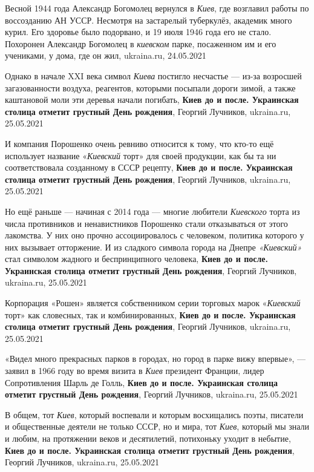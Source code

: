 Весной 1944 года Александр Богомолец вернулся в \emph{Киев}, где возглавил работы по
воссозданию АН УССР. Несмотря на застарелый туберкулёз, академик много курил.
Его здоровье было подорвано, и 19 июля 1946 года его не стало. Похоронен
Александр Богомолец в \emph{киевском} парке, посаженном им и его учениками, у дома,
где он жил, ukraina.ru, 24.05.2021

Однако в начале XXI века символ \emph{Киева} постигло несчастье — из-за
возросшей загазованности воздуха, реагентов, которыми посыпали дороги зимой, а
также каштановой моли эти деревья начали погибать, 
\textbf{Киев до и после. Украинская столица отметит грустный День рождения}, Георгий Лучников, ukraina.ru, 25.05.2021

И компания Порошенко очень ревниво относится к тому, что кто-то ещё использует
название «\emph{Киевский} торт» для своей продукции, как бы та ни
соответствовала созданному в СССР рецепту,
\textbf{Киев до и после. Украинская столица отметит грустный День рождения}, Георгий Лучников, ukraina.ru, 25.05.2021

Но ещё раньше — начиная с 2014 года — многие любители \emph{Киевского} торта из
числа противников и ненавистников Порошенко стали отказываться от этого
лакомства. У них оно прочно ассоциировалось с человеком, политика которого у
них вызывает отторжение. И из сладкого символа города на Днепре
\emph{«Киевский»} стал символом жадного и беспринципного человека, 
\textbf{Киев до и после. Украинская столица отметит грустный День рождения}, Георгий Лучников, ukraina.ru, 25.05.2021

Корпорация «Рошен» является собственником серии торговых марок «\emph{Киевский}
торт» как словесных, так и комбинированных, 
\textbf{Киев до и после. Украинская столица отметит грустный День рождения}, Георгий Лучников, ukraina.ru, 25.05.2021

«Видел много прекрасных парков в городах, но город в парке вижу впервые», —
заявил в 1966 году во время визита в \emph{Киев} президент Франции, лидер
Сопротивления Шарль де Голль,
\textbf{Киев до и после. Украинская столица отметит грустный День рождения}, Георгий Лучников, ukraina.ru, 25.05.2021

В общем, тот \emph{Киев}, который воспевали и которым восхищались поэты,
писатели и общественные деятели не только СССР, но и мира, тот \emph{Киев},
который мы знали и любим, на протяжении веков и десятилетий, потихоньку уходит
в небытие, 
\textbf{Киев до и после. Украинская столица отметит грустный День рождения}, Георгий Лучников, ukraina.ru, 25.05.2021

